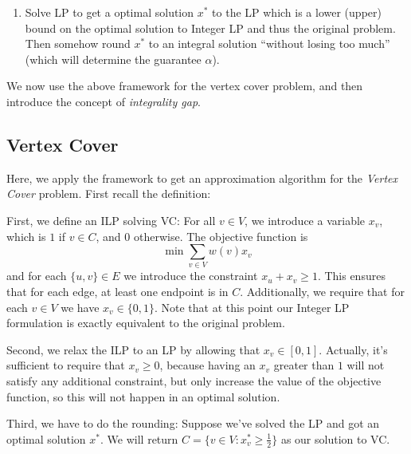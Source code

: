 \begin{enumerate}[resume]
  \item Solve LP to get a optimal solution $x^*$ to the LP which is a lower (upper) bound on the
    optimal solution to Integer LP and thus the original problem. Then somehow round $x^*$ to an
    integral solution ``without losing too much'' (which will determine the guarantee $\alpha$).
\end{enumerate}

We now use the above framework for the vertex cover problem, and then introduce the concept of
\emph{integrality gap}.

\subsection{Vertex Cover}

Here, we apply the framework to get an approximation algorithm for the \emph{Vertex Cover} problem.
First recall the definition:


First, we define an ILP solving VC: For all $v\in V$, we introduce a variable $x_v$, which is $1$
if $v\in C$, and $0$ otherwise. The objective function is
\[
  \min\sum_{v\in V}w(v)x_v
\]
and for each $\{u,v\}\in E$ we introduce the constraint $x_u+x_v\ge 1$. This ensures that for each
edge, at least one endpoint is in $C$. Additionally, we require that for each $v\in V$ we have
$x_v\in\{0,1\}$. Note that at this point our Integer LP formulation is exactly equivalent to the
original problem.

Second, we relax the ILP to an LP by allowing that $x_v\in[0,1]$. Actually, it's sufficient to
require that $x_v\ge 0$, because having an $x_v$ greater than $1$ will not satisfy any additional
constraint, but only increase the value of the objective function, so this will not happen in an
optimal solution.

Third, we have to do the rounding: Suppose we've solved the LP and got an optimal solution $x^*$.
We will return $C=\{v\in V: x^*_v\ge\frac12\}$ as our solution to VC.



